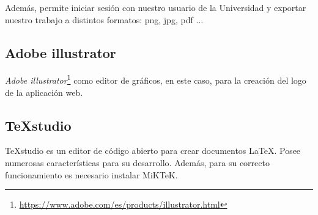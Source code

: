 Además, permite iniciar sesión con nuestro usuario de la Universidad y exportar nuestro trabajo a distintos formatos: png, jpg, pdf $\dots$

\subsection{Adobe illustrator}
\textit{Adobe illustrator}\footnote{\url{https://www.adobe.com/es/products/illustrator.html}} como editor de gráficos, en este caso, para la creación del logo de la aplicación web.

\subsection{\TeX\hspace{0mm}studio}
\TeX\hspace{0mm}studio es un editor de código abierto para crear documentos \LaTeX. Posee numerosas características para su desarrollo. Además, para su correcto funcionamiento es necesario instalar MiKTeK.

